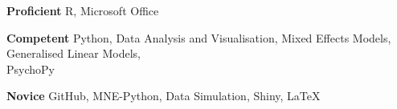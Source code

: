 \textbf{Proficient} \phantom{:} R, Microsoft Office

\textbf{Competent} Python, Data Analysis and Visualisation, Mixed Effects Models, Generalised Linear Models, \\
 PsychoPy

\textbf{Novice}  GitHub, MNE-Python, Data Simulation, Shiny, LaTeX
